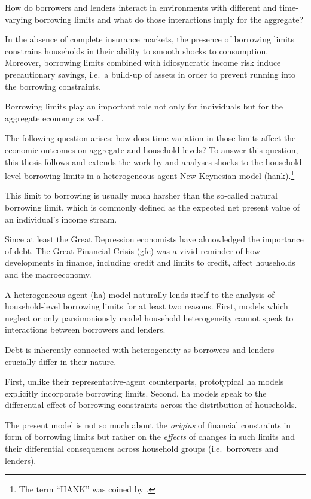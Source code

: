 \documentclass[12pt]{article} %
\numberwithin{equation}{section} %
\begin{document}
How do borrowers and lenders interact in environments with different and time-varying borrowing limits and what do those interactions imply for the aggregate?

In the absence of complete insurance markets, the presence of borrowing limits constrains households in their ability to smooth shocks to consumption. Moreover, borrowing limits combined with idiosyncratic income risk induce precautionary savings, i.e.~a build-up of assets in order to prevent running into the borrowing constraints. 

Borrowing limits play an important role not only for individuals but for the aggregate economy as well.

The following question arises: how does time-variation in those limits affect the economic outcomes on aggregate and household levels? To answer this question, this thesis follows and extends the work by \textcite{gl2017} and analyses shocks to the household-level borrowing limits in a heterogeneous agent New Keynesian model (\Gls{hank}).\footnote{The term \enquote{HANK} was coined by \textcite{kaplan2018}.}

This limit to borrowing is usually much harsher than the so-called natural borrowing limit, which is commonly defined as the expected net present value of an individual's income stream. 

Since at least the Great Depression economists have aknowledged the importance of debt. The Great Financial Crisis (\Gls{gfc}) was a vivid reminder of how developments in finance, including credit and limits to credit, affect households and the macroeconomy. 

A heterogeneous-agent (\Gls{ha}) model naturally lends itself to the analysis of household-level borrowing limits for at least two reasons. First, models which neglect or only parsimoniously model household heterogeneity cannot speak to interactions between borrowers and lenders.

Debt is inherently connected with heterogeneity as borrowers and lenders crucially differ in their nature.

First, unlike their representative-agent counterparts, prototypical \Gls{ha} models explicitly incorporate borrowing limits. Second, \Gls{ha} models speak to the differential effect of borrowing constraints across the distribution of households.

The present model is not so much about the \textit{origins} of financial constraints in form of borrowing limits but rather on the \textit{effects} of changes in such limits and their differential consequences across household groups (i.e.~borrowers and lenders).
\end{document}
